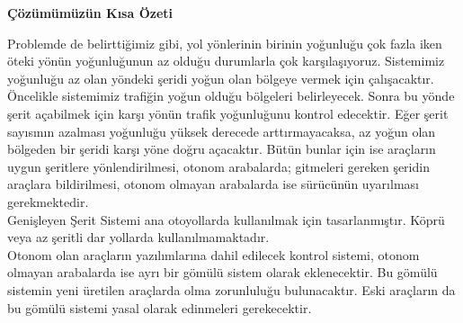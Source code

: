 \documentclass[12pt,a4paper]{report}
\begin{document}
{\Large\bfseries Çözümümüzün Kısa Özeti \\ \par} 
 Problemde de belirttiğimiz gibi, yol yönlerinin birinin yoğunluğu çok fazla iken öteki yönün yoğunluğunun az olduğu durumlarla çok karşılaşıyoruz. Sistemimiz yoğunluğu az olan yöndeki şeridi yoğun olan bölgeye vermek için çalışacaktır. Öncelikle sistemimiz trafiğin yoğun olduğu bölgeleri belirleyecek. Sonra bu yönde şerit açabilmek için karşı yönün trafik yoğunluğunu kontrol edecektir. Eğer şerit sayısının azalması yoğunluğu yüksek derecede arttırmayacaksa, az yoğun olan bölgeden bir şeridi karşı yöne doğru açacaktır. Bütün bunlar için ise araçların uygun şeritlere yönlendirilmesi, otonom arabalarda; gitmeleri gereken şeridin araçlara bildirilmesi, otonom olmayan arabalarda ise sürücünün uyarılması gerekmektedir.\\
 
 Genişleyen Şerit Sistemi ana otoyollarda kullanılmak için tasarlanmıştır. Köprü veya az şeritli dar yollarda kullanılmamaktadır.\\
 
 Otonom olan araçların yazılımlarına dahil edilecek kontrol sistemi, otonom olmayan arabalarda ise ayrı bir gömülü sistem olarak eklenecektir. Bu gömülü sistemin yeni üretilen araçlarda olma zorunluluğu bulunacaktır. Eski araçların da bu gömülü sistemi yasal olarak edinmeleri gerekecektir. \\ \\ \\
 
\end{document}
